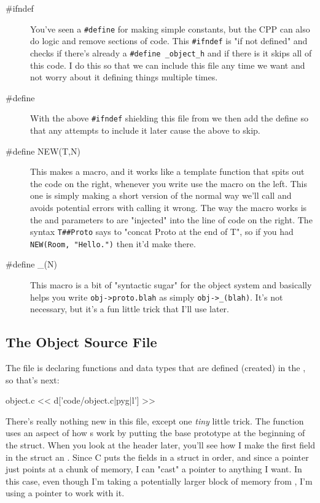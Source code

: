 \begin{description}

\item[\#ifndef] You've seen a \verb|#define| for making simple constants, but
    the CPP can also do logic and remove sections of code.  This \verb|#ifndef| is
    "if not defined" and checks if there's already a \verb|#define _object_h| and
    if there is it skips all of this code.  I do this so that we can include
    this file any time we want and not worry about it defining things multiple
    times.
\item[\#define] With the above \verb|#ifndef| shielding this file from we then
    add the  define so that any attempts to include it later
    cause the above to skip.
\item[\#define NEW(T,N)]  This makes a macro, and it works like a template function
    that spits out the code on the right, whenever you write use the macro
    on the left.  This one is simply making a short version of the normal way
    we'll call  and avoids potential errors with calling it
    wrong.  The way the macro works is the  and  parameters
    to  are "injected" into the line of code on the right.  The
    syntax \verb|T##Proto| says to "concat Proto at the end of T", so if you had
    \verb|NEW(Room, "Hello.")| then it'd make  there.
\item[\#define \_(N)] This macro is a bit of "syntactic sugar" for the object
    system and basically helps you write \verb|obj->proto.blah| as simply
    \verb|obj->_(blah)|.  It's not necessary, but it's a fun little trick
    that I'll use later.
\end{description}

\subsection{The Object Source File}

The  file is declaring functions and data types that are defined
(created) in the , so that's next:

\begin{code}{object.c}
<< d['code/object.c|pyg|l'] >>
\end{code}

There's really nothing new in this file, except one \emph{tiny} little trick.
The function  uses an aspect of how s work
by putting the base prototype at the beginning of the struct.  When you look
at the  header later, you'll see how I make the first field
in the struct an .  Since C puts the fields in a struct
in order, and since a pointer just points at a chunk of memory, I can
"cast" a pointer to anything I want.  In this case, even though I'm taking
a potentially larger block of memory from , I'm using a
 pointer to work with it.

